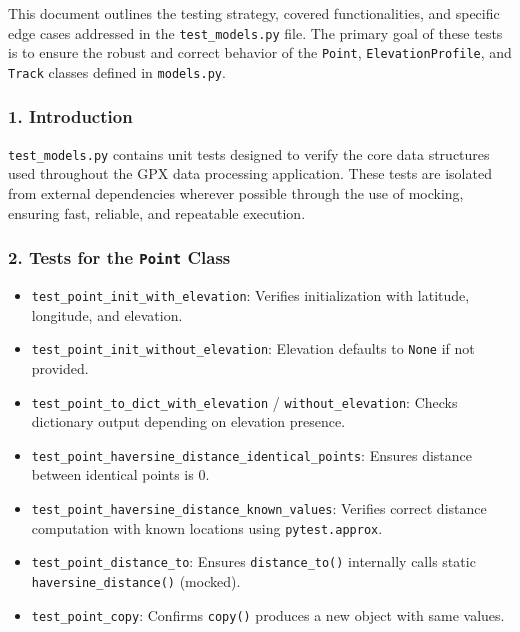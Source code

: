 \documentclass[12pt]{article}
\begin{document}
This document outlines the testing strategy, covered functionalities, and specific edge cases addressed in the \texttt{test\_models.py} file. The primary goal of these tests is to ensure the robust and correct behavior of the \texttt{Point}, \texttt{ElevationProfile}, and \texttt{Track} classes defined in \texttt{models.py}.

\subsubsection*{1. Introduction}
\texttt{test\_models.py} contains unit tests designed to verify the core data structures used throughout the GPX data processing application. These tests are isolated from external dependencies wherever possible through the use of mocking, ensuring fast, reliable, and repeatable execution.

\subsubsection*{2. Tests for the \texttt{Point} Class}
\begin{itemize}
  \item \texttt{test\_point\_init\_with\_elevation}: Verifies initialization with latitude, longitude, and elevation.
  \item \texttt{test\_point\_init\_without\_elevation}: Elevation defaults to \texttt{None} if not provided.
  \item \texttt{test\_point\_to\_dict\_with\_elevation} / \texttt{without\_elevation}: Checks dictionary output depending on elevation presence.
  \item \texttt{test\_point\_haversine\_distance\_identical\_points}: Ensures distance between identical points is 0.
  \item \texttt{test\_point\_haversine\_distance\_known\_values}: Verifies correct distance computation with known locations using \texttt{pytest.approx}.
  \item \texttt{test\_point\_distance\_to}: Ensures \texttt{distance\_to()} internally calls static \texttt{haversine\_distance()} (mocked).
  \item \texttt{test\_point\_copy}: Confirms \texttt{copy()} produces a new object with same values.
\end{itemize}
\end{document}
